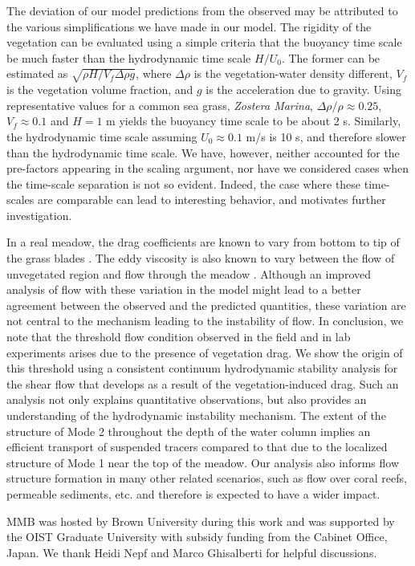 \documentclass[aps,prl,twocolumn,superscriptaddress,10pt]{revtex4-1}  %
\begin{document}
\newline
The deviation of our model predictions from the observed may be attributed to the various simplifications we have made in our model. 
The rigidity of the vegetation can be evaluated using a simple criteria that the buoyancy time scale  be much faster than the hydrodynamic time scale $H/U_0$.
The former can be estimated as $\sqrt{\rho H/V_f \Delta \rho g}$, where $\Delta \rho$ is the vegetation-water density different, $V_f$ is the vegetation volume fraction, and $g$ is the acceleration due to gravity. 
Using representative values for a common sea grass, \textit{Zostera Marina}, $\Delta \rho /\rho \approx 0.25$, $V_f \approx 0.1$ and $H=1$ m \cite{Fonseca98} yields the buoyancy time scale to be about 2 s. 
Similarly, the hydrodynamic time scale assuming $U_0 \approx 0.1$ m/s is 10 s, and therefore slower than the hydrodynamic time scale.
We have, however, neither accounted for the pre-factors appearing in the scaling argument, nor have we considered cases when the time-scale separation is not so evident.
Indeed, the case where these time-scales are comparable can lead to interesting behavior\cite{Delangre06}, and motivates further investigation. 

In a real meadow, the drag coefficients are known to vary from bottom to tip of the grass blades \cite{Vivoni98,Nepf00}. 
The eddy viscosity is also known to vary between the flow of unvegetated region and flow through the meadow \cite{Ghisal02}. 
Although an improved analysis of flow with these variation in the model might lead to a better agreement between the observed and the predicted quantities, these variation are not central to the mechanism leading to the instability of flow.
\newline
In conclusion, we note that the threshold flow condition observed in the field and in lab experiments arises due to the presence of vegetation drag. 
We show the origin of this threshold using a consistent continuum hydrodynamic stability analysis for the shear flow that develops as a result of the vegetation-induced drag. 
Such an analysis not only explains quantitative observations, but also provides an understanding of the hydrodynamic instability mechanism. 
The extent of the structure of Mode 2 throughout the depth of the water column implies an efficient transport of suspended tracers compared to that due to the localized structure of Mode 1 near the top of the meadow. 
Our analysis also informs flow structure formation in many other related scenarios, such as flow over coral reefs, permeable sediments, etc. and therefore is expected to have a wider impact.

\acknowledgments
MMB was hosted by Brown University during this work and was supported by the OIST Graduate University with subsidy funding from the Cabinet Office, Japan. We thank Heidi Nepf and Marco Ghisalberti for helpful discussions.

{}

\end{document}

